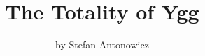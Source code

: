 \documentclass{article}
\title{{\Huge\fffancy The Totality of Ygg }}
\author{by Stefan Antonowicz}
\date{}
\newcommand{\yggMechanics}{}
\newcommand{\yggAllies}{}
\newcommand{\yggMechanicsText}{}
\newcommand{\yggAlliesText}{}
\begin{document}
\fftext

\begin{titlingpage}
  \maketitle
\end{titlingpage}

\begin{multicols*}{2}
  \let\clearpage\relax
  \vspace{-5cm}
  \small\fftext\tableofcontents
\end{multicols*}
\vfill\newpage
\noindent\yggMechanics
\vfill\newpage
\begin{multicols}{2}
  \noindent\yggMechanicsText
\end{multicols}
\vfill\newpage
\noindent\yggAllies
\vfill\newpage
\begin{multicols}{2}
  \noindent\yggAlliesText
\end{multicols}
\vfill\newpage
\end{document}
